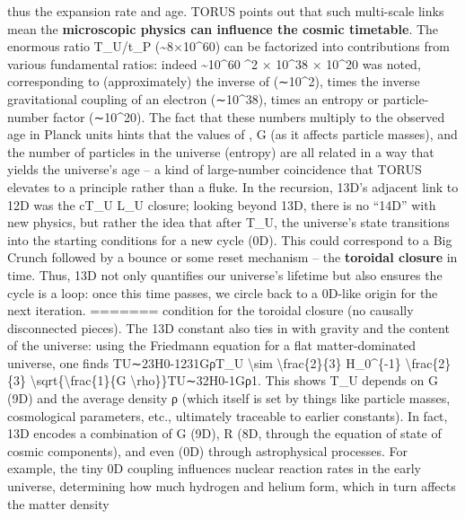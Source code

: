 \documentclass[]{article}
\begin{document}
{thus the expansion rate and age. TORUS points out that such multi-scale
links mean the \textbf{microscopic physics can influence the cosmic
timetable}. The enormous ratio T\_U/t\_P (\textasciitilde8×10\^{}60) can
be factorized into contributions from various fundamental ratios: indeed
\textasciitilde10\^{}60 \^{}2 × 10\^{}38 × 10\^{}20 was
noted\hspace{0pt}, corresponding to (approximately) the inverse of \alpha
(∼10\^{}2), times the inverse gravitational coupling of an electron
(∼10\^{}38), times an entropy or particle-number factor (∼10\^{}20). The
fact that these numbers multiply to the observed age in Planck units
hints that the values of \alpha, G (as it affects particle masses), and the
number of particles in the universe (entropy) are all related in a way
that yields the universe's age -- a kind of large-number coincidence
that TORUS elevates to a principle rather than a fluke\hspace{0pt}. In
the recursion, 13D's adjacent link to 12D was the cT\_U \approx L\_U closure;
looking beyond 13D, there is no ``14D'' with new physics, but rather the
idea that after T\_U, the universe's state transitions into the starting
conditions for a new cycle (0D)\hspace{0pt}. This could correspond to a
Big Crunch followed by a bounce or some reset mechanism -- the
\textbf{toroidal closure} in time. Thus, 13D not only quantifies our
universe's lifetime but also ensures the cycle is a loop: once this time
passes, we circle back to a 0D-like origin for the next iteration.
=======
condition for the toroidal closure (no causally disconnected pieces)​.
The 13D constant also ties in with gravity and the content of the
universe: using the Friedmann equation for a flat matter-dominated
universe, one finds TU∼23H0-1\approx231GρT\_U \textbackslash{}sim
\textbackslash{}frac\{2\}\{3\} H\_0\^{}\{-1\} \approx
\textbackslash{}frac\{2\}\{3\}
\textbackslash{}sqrt\{\textbackslash{}frac\{1\}\{G
\textbackslash{}rho\}\}TU​∼32​H0-1​​Gρ1​​​. This shows T\_U depends
on G (9D) and the average density ρ (which itself is set by things like
particle masses, cosmological parameters, etc., ultimately traceable to
earlier constants). In fact, 13D encodes a combination of G (9D), R (8D,
through the equation of state of cosmic components), and even \alpha (0D)
through astrophysical processes​. For example, the tiny 0D coupling \alpha
influences nuclear reaction rates in the early universe, determining how
much hydrogen and helium form, which in turn affects the matter density
}
\end{document}
